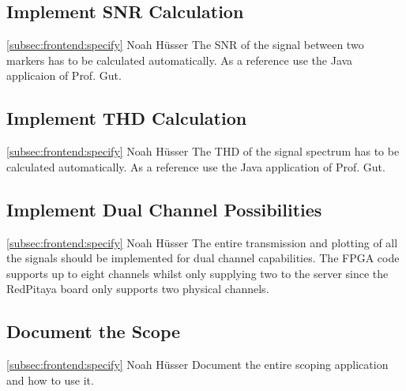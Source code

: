 \documentclass[a4paper,oneside]{alpenspecs/alpenspecs}
\begin{document}
\subsection{Implement SNR Calculation}
\label{subsec:frontend:}
\wpac
    {}
    {}
    {}
    {\ref{subsec:frontend:specify}}
    {}
    {Noah Hüsser}
    {%
        The SNR of the signal between two markers has to be calculated automatically.
        As a reference use the Java applicaion of Prof. Gut.
    }

\subsection{Implement THD Calculation}
\label{subsec:frontend:}
\wpac
    {}
    {}
    {}
    {\ref{subsec:frontend:specify}}
    {}
    {Noah Hüsser}
    {%
        The THD of the signal spectrum has to be calculated automatically.
        As a reference use the Java application of Prof. Gut.
    }

\subsection{Implement Dual Channel Possibilities}
\label{subsec:frontend:}
\wpac
    {}
    {}
    {}
    {\ref{subsec:frontend:specify}}
    {}
    {Noah Hüsser}
    {%
        The entire transmission and plotting of all the signals should be implemented for dual channel capabilities.
        The FPGA code supports up to eight channels whilst only supplying two to the server since the RedPitaya board only supports two physical channels.
    }

\subsection{Document the Scope}
\label{subsec:frontend:}
\wpac
    {}
    {}
    {}
    {\ref{subsec:frontend:specify}}
    {}
    {Noah Hüsser}
    {%
        Document the entire scoping application and how to use it.
    }


\backmatter
\end{document}
